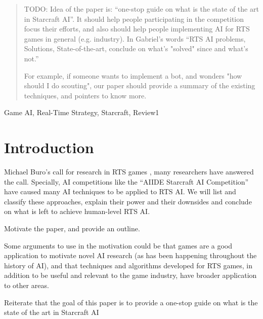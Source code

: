 \documentclass[journal]{IEEEtran}
\begin{document}
{\color{blue}
\begin{abstract}
TODO: Idea of the paper is: ``one-stop guide on what is the
state of the art in Starcraft AI''. It should help people participating in the competition focus
their efforts, and also should help people implementing AI for RTS games in
general (e.g. industry).  In Gabriel's words ``RTS AI problems, Solutions, State-of-the-art, conclude on what's "solved" since \cite{Buro03rts} and what's not.'' 

For example, if someone wants to implement a bot, and wonders "how should I do scouting", our paper should provide a summary of the existing techniques, and pointers to know more.
\end{abstract}
}

\begin{IEEEkeywords}
Game AI, Real-Time Strategy, Starcraft, Review1

\end{IEEEkeywords}

%
\IEEEpeerreviewmaketitle

\section{Introduction}\label{sec:intro}
 Michael Buro's call for research in RTS games \cite{Buro03rts}, many researchers have answered the call. Specially, AI competitions like the ``AIIDE Starcraft AI Competition'' have caused many AI techniques to be
applied to RTS AI. We will list and classify these approaches, explain their 
power and their downsides and conclude on what is left to achieve human-level 
RTS AI.

{\color{blue}
Motivate the paper, and provide an outline.

Some arguments to use in the motivation could be that games are a good application to motivate novel AI research (as has been happening throughout the history of AI), and that techniques and algorithms developed for RTS games, in addition to be useful and relevant to the game industry, have broader application to other areas.

Reiterate that the goal of this paper is to provide a one-stop guide on what is the
state of the art in Starcraft AI
}
\end{document}

